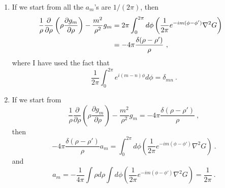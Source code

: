 \documentclass[12pt]{article}
\begin{document}
\begin{enumerate}
    \item If we start from all the $a_m$'s are $1/(2\pi)$, then
    \begin{align}
        \frac{1}{\rho} \frac{\partial}{\partial \rho} \left(\rho \frac{\partial g_m}{\partial \rho}\right)-\frac{m^2}{\rho^2}g_m &= 2\pi\int_0^{2\pi} d\phi \left(\frac{1}{2\pi} e^{-im(\phi - \phi')} \nabla^2 G\right) \cr
        &= - 4 \pi \frac{\delta (\rho - \rho')}{\rho}~,
    \end{align}
    where I have used the fact that
    \begin{equation}
        \frac{1}{2\pi} \int_0^{2\pi} e^{i(m-n)\phi} d\phi = \delta_{mn}~.
    \end{equation}
    \item If we start from
    \begin{equation}
        \frac{1}{\rho} \frac{\partial}{\partial \rho} \left(\rho \frac{\partial g_m}{\partial \rho}\right)-\frac{m^2}{\rho^2}g_m = - 4 \pi \frac{\delta (\rho - \rho')}{\rho}~,
    \end{equation}
    then
    \begin{equation}
        -4\pi \frac{\delta(\rho - \rho')}{\rho} a_m = \int_0^{2\pi} d\phi \left(\frac{1}{2\pi} e^{-im(\phi - \phi')} \nabla^2 G\right)~.
    \end{equation}
    and
    \begin{equation}
        a_m = -\frac{1}{4\pi} \int \rho d\rho\int d \phi\left(\frac{1}{2\pi} e^{-im(\phi - \phi')} \nabla^2 G\right) = \frac{1}{2\pi}~.
    \end{equation}
\end{enumerate}
\end{document}
